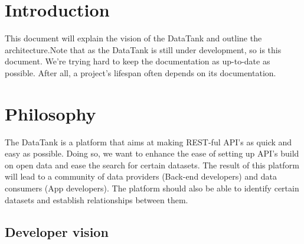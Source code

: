 \documentclass[12pt]{article}
\begin{document}
\maketitle

\section{Introduction}
This document will explain the vision of the DataTank and outline the architecture.Note that as the DataTank is still under development, so is this document. We're trying hard to keep the documentation as up-to-date as possible. After all, a project's lifespan often depends on its documentation.

\section{Philosophy}
The DataTank is a platform that aims at making REST-ful API's as quick and easy as possible. Doing so, we want to enhance the ease of setting up API's build on open data and ease the search for certain datasets. The result of this platform will lead to a community of data providers (Back-end developers) and data consumers (App developers). The platform should also be able to identify certain datasets and establish relationships between them.

\subsection{Developer vision}
\end{document}
